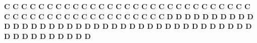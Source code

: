 \documentclass[11pt]{report}
\begin{document}
\thispagestyle{empty}
\fontsize{60}{70}\selectfont

\noindent \textbf{C C C C C C C C C C C C C C C C C C C C C C C C C C C C C C C C C C C C C C C C C C C C C C C C}
\newpage
\thispagestyle{empty}
\noindent \textbf{D D D D D D D D D D D D D D D D D D D D D D D D D D D D D D D D D D D D D D D D D D D D D D D D}
\end{document}
